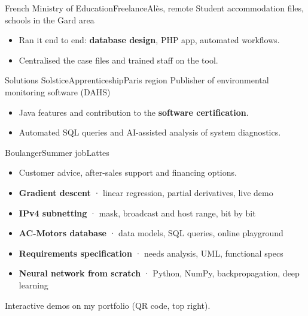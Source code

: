 \begin{minipage}[t]{\mainwidth}
  {French Ministry of Education}{Freelance}{Alès, remote}
  {Student accommodation files, schools in the Gard area}
\begin{itemize}
  \item Ran it end to end: \textbf{database design}, PHP app, automated workflows.
  \item Centralised the case files and trained staff on the tool.
\end{itemize}

  {Solutions Solstice}{Apprenticeship}{Paris region}
  {Publisher of environmental monitoring software (DAHS)}
\begin{itemize}
  \item Java features and contribution to the \textbf{software certification}.
  \item Automated SQL queries and AI-assisted analysis of system diagnostics.
\end{itemize}

  {Boulanger}{Summer job}{Lattes}{}
\begin{itemize}
  \item Customer advice, after-sales support and financing options.
\end{itemize}

\begin{itemize}[itemsep=1pt]
  \item \textbf{Gradient descent} {\color{muted}· linear regression, partial derivatives, live demo}
  \item \textbf{IPv4 subnetting} {\color{muted}· mask, broadcast and host range, bit by bit}
  \item \textbf{AC-Motors database} {\color{muted}· data models, SQL queries, online playground}
  \item \textbf{Requirements specification} {\color{muted}· needs analysis, UML, functional specs}
  \item \textbf{Neural network from scratch} {\color{muted}· Python, NumPy, backpropagation, deep learning}
\end{itemize}
{\small\color{muted}Interactive demos on my portfolio (QR code, top right).}

\end{minipage}%
\hfill%
